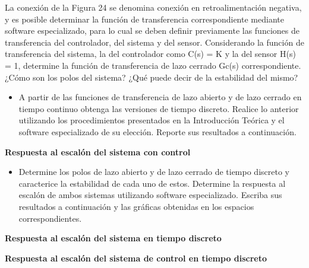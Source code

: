 La conexión de la Figura 24 se denomina conexión en retroalimentación negativa, y es posible determinar la función de transferencia correspondiente mediante software especializado, para lo cual se deben definir
previamente las funciones de transferencia del controlador, del sistema y del sensor. Considerando la función de transferencia del sistema, la del controlador como C(s) = K y la del sensor H(s) = 1, determine
la función de transferencia de lazo cerrado Gc(s) correspondiente. ¿Cómo son los polos del sistema? ¿Qué puede decir de la estabilidad del mismo?

\begin{itemize}
	\item A partir de las funciones de transferencia de lazo abierto y de lazo cerrado en tiempo continuo obtenga las versiones de tiempo discreto. Realice lo anterior utilizando los procedimientos presentados en la
	Introducción Teórica y el software especializado de su elección. Reporte sus resultados a continuación.
\end{itemize}

\textbf{Respuesta al escalón del sistema con control}

\begin{itemize}
	\item Determine los polos de lazo abierto y de lazo cerrado de tiempo discreto y caracterice la estabilidad de
	cada uno de estos. Determine la respuesta al escalón de ambos sistemas utilizando software especializado.
	Escriba sus resultados a continuación y las gráficas obtenidas en los espacios correspondientes.
\end{itemize}

\textbf{Respuesta al escalón del sistema en tiempo discreto}

\textbf{Respuesta al escalón del sistema de control en tiempo discreto}